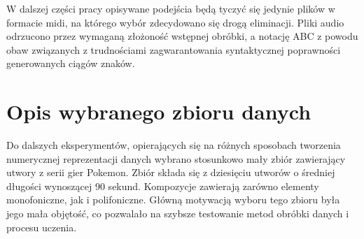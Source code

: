 {{{            W\,\,dalszej części pracy opisywane podejścia będą tyczyć się jedynie plików w\,\,formacie midi, na którego 
            wybór zdecydowano się drogą eliminacji. Pliki audio odrzucono przez wymaganą złożoność wstępnej obróbki,
            a\,\,notację ABC z\,\,powodu obaw związanych z\,\,trudnościami zagwarantowania syntaktycznej poprawności 
            generowanych ciągów znaków.
        }
    }

    \section{Opis wybranego zbioru danych}
    {
        Do dalszych eksperymentów, opierających się na różnych sposobach tworzenia numerycznej reprezentacji
        danych wybrano stosunkowo mały zbiór zawierający utwory z\,\,serii gier Pokemon.
        Zbiór składa się z\,\,dziesięciu utworów o\,\,średniej długości wynoszącej 90 sekund. Kompozycje zawierają zarówno 
        elementy monofoniczne, jak i\,\,polifoniczne. Główną motywacją wyboru tego zbioru była jego mała objętość,
        co pozwalało na szybsze testowanie metod obróbki danych i\,\,procesu uczenia.
    }
}
